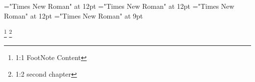 \documentclass[a4paper]{article}
\begin{document}
 
\pagestyle{plain} 
\font\scriptureTextscrBody="Times New Roman" at 12pt
\font\sectionscriptureTextscrBody="Times New Roman" at 12pt
\font\psectionscriptureTextscrBody="Times New Roman" at 12pt
\font\footnotepsectionscriptureTextscrBody="Times New Roman" at 9pt

\pagestyle{fancy} 
\begin{adjustwidth}{12pt}{0pt}{12pt}{0pt}
  \footnote {1:1 FootNote Content}   \footnote {1:2 second chapter
                  } \end{adjustwidth} 
\end{document}
